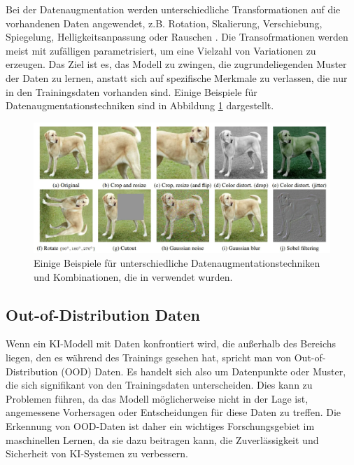 Bei der Datenaugmentation werden unterschiedliche Transformationen auf die vorhandenen Daten angewendet, z.B. Rotation, Skalierung, Verschiebung, Spiegelung, Helligkeitsanpassung oder Rauschen \parencite{Shorten2019dataaugmentation}. Die Transofrmationen werden meist mit zufälligen parametrisiert, um eine Vielzahl von Variationen zu erzeugen. Das Ziel ist es, das Modell zu zwingen, die zugrundeliegenden Muster der Daten zu lernen, anstatt sich auf spezifische Merkmale zu verlassen, die nur in den Trainingsdaten vorhanden sind. Einige Beispiele für Datenaugmentationstechniken sind in Abbildung \ref{fig:data-augmentation} dargestellt.

\begin{figure}[h]
	\centering
	\includegraphics[width=\textwidth]{figure_data_augmentation.png}
	\caption{Einige Beispiele für unterschiedliche Datenaugmentationstechniken\\
	und Kombinationen, die in \parencite{Chen2020simclr} verwendet wurden.}
	\label{fig:data-augmentation}
\end{figure}

\subsection{Out-of-Distribution Daten} \label{sec:ood}

Wenn ein KI-Modell mit Daten konfrontiert wird, die außerhalb des Bereichs liegen, den es während des Trainings gesehen hat, spricht man von Out-of-Distribution (OOD) Daten. Es handelt sich also um Datenpunkte oder Muster, die sich signifikant von den Trainingsdaten unterscheiden. Dies kann zu Problemen führen, da das Modell möglicherweise nicht in der Lage ist, angemessene Vorhersagen oder Entscheidungen für diese Daten zu treffen. Die Erkennung von OOD-Daten ist daher ein wichtiges Forschungsgebiet im maschinellen Lernen, da sie dazu beitragen kann, die Zuverlässigkeit und Sicherheit von KI-Systemen zu verbessern.

